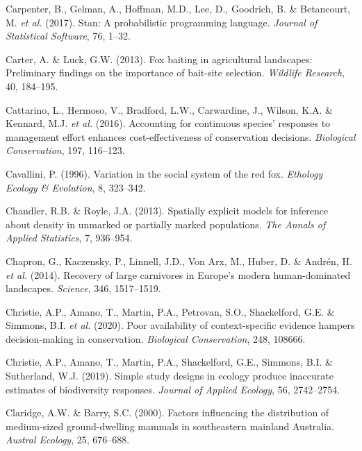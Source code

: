 \documentclass[11pt,a4paper,titlepage,twoside,openright]{style/unimelbthesis}
\begin{document}
\begin{mainmatter}
\leavevmode\hypertarget{ref-carpenter2017stan}{}%
Carpenter, B., Gelman, A., Hoffman, M.D., Lee, D., Goodrich, B. \& Betancourt, M. \emph{et al.} (2017). Stan: A probabilistic programming language. \emph{Journal of Statistical Software}, 76, 1--32.

\leavevmode\hypertarget{ref-carter2013fox}{}%
Carter, A. \& Luck, G.W. (2013). Fox baiting in agricultural landscapes: Preliminary findings on the importance of bait-site selection. \emph{Wildlife Research}, 40, 184--195.

\leavevmode\hypertarget{ref-cattarino2016accounting}{}%
Cattarino, L., Hermoso, V., Bradford, L.W., Carwardine, J., Wilson, K.A. \& Kennard, M.J. \emph{et al.} (2016). Accounting for continuous species' responses to management effort enhances cost-effectiveness of conservation decisions. \emph{Biological Conservation}, 197, 116--123.

\leavevmode\hypertarget{ref-cavallini1996variation}{}%
Cavallini, P. (1996). Variation in the social system of the red fox. \emph{Ethology Ecology \& Evolution}, 8, 323--342.

\leavevmode\hypertarget{ref-chandler2013spatially}{}%
Chandler, R.B. \& Royle, J.A. (2013). Spatially explicit models for inference about density in unmarked or partially marked populations. \emph{The Annals of Applied Statistics}, 7, 936--954.

\leavevmode\hypertarget{ref-chapron2014recovery}{}%
Chapron, G., Kaczensky, P., Linnell, J.D., Von Arx, M., Huber, D. \& Andrén, H. \emph{et al.} (2014). Recovery of large carnivores in Europe's modern human-dominated landscapes. \emph{Science}, 346, 1517--1519.

\leavevmode\hypertarget{ref-christie2020poor}{}%
Christie, A.P., Amano, T., Martin, P.A., Petrovan, S.O., Shackelford, G.E. \& Simmons, B.I. \emph{et al.} (2020). Poor availability of context-specific evidence hampers decision-making in conservation. \emph{Biological Conservation}, 248, 108666.

\leavevmode\hypertarget{ref-christie2019simple}{}%
Christie, A.P., Amano, T., Martin, P.A., Shackelford, G.E., Simmons, B.I. \& Sutherland, W.J. (2019). Simple study designs in ecology produce inaccurate estimates of biodiversity responses. \emph{Journal of Applied Ecology}, 56, 2742--2754.

\leavevmode\hypertarget{ref-claridge2000factors}{}%
Claridge, A.W. \& Barry, S.C. (2000). Factors influencing the distribution of medium-sized ground-dwelling mammals in southeastern mainland Australia. \emph{Austral Ecology}, 25, 676--688.


\end{mainmatter}
\end{document}
